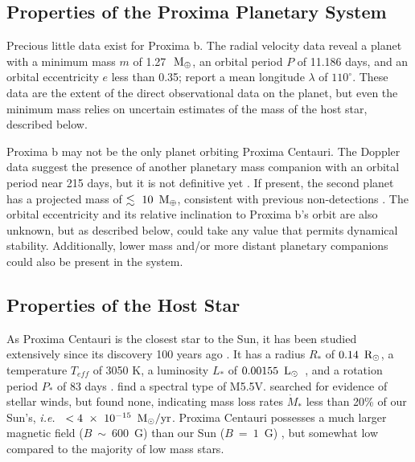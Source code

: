\documentclass[preprint,12pt]{aastex}
\def\mearth{{\rm\,M_\oplus}}
\def\msun{{\rm\,M_\odot}}
\def\rsun{{\rm\,R_\odot}}
\def\lsun{{\rm\,L_\odot}}
\def\ie{{\it i.e.\ }}
\begin{document}
\subsection{Properties of the Proxima Planetary System}
\label{sec:obs:planetsys}
Precious little data exist for Proxima b. The radial velocity data
reveal a planet with a minimum mass $m$ of 1.27~$\mearth$, an orbital period $P$
of 11.186 days, and an orbital eccentricity $e$ less than 0.35;
\cite{AngladaEscude16} report a mean longitude $\lambda$ of $110^\circ$. These
data are the extent of the direct observational data on the planet,
but even the minimum mass relies on uncertain estimates of the mass of
the host star, described below.

Proxima b may not be the only planet orbiting Proxima
Centauri. The Doppler data suggest the presence of another planetary
mass companion with an orbital period near 215 days, but it is not
definitive yet \citep{AngladaEscude16}. If present, the second planet has a
projected mass of $\lesssim~10~\mearth$, consistent with previous
non-detections \citep{EndlKurster08,Barnes14,Lurie14}. The orbital
eccentricity and its relative inclination to Proxima b's orbit are also
unknown, but as described below, could take any value that permits
dynamical stability. Additionally, lower mass and/or more distant
planetary companions could also be present in the system.

\subsection{Properties of the Host Star}
\label{sec:obs:star}
As Proxima Centauri is the closest star to the Sun, it has been studied
extensively since its discovery 100 years ago \citep{Innes1915}.  It
has a radius $R_*$ of $0.14~\rsun$, a temperature $T_{eff}$ of 3050 K, a
luminosity $L_*$ of $0.00155~\lsun$~\citep{Boyajian12}, and a rotation
period $P_*$ of 83 days \citep{Benedict98}. \cite{AngladaEscude16} find a 
spectral type of M5.5V. \cite{Wood01} searched for
evidence of stellar winds, but found none, indicating mass loss rates
$\dot{M}_*$ less than 20\% of our Sun's, \ie
$<4~\times~10^{-15}~\msun/\textrm{yr}$. Proxima Centauri possesses a
much larger magnetic field ($B~\sim~600$~G) than our Sun ($B~=~1$~G)
\citep{ReinersBasri08}, but somewhat low compared to the majority of
low mass stars. 
\end{document}
